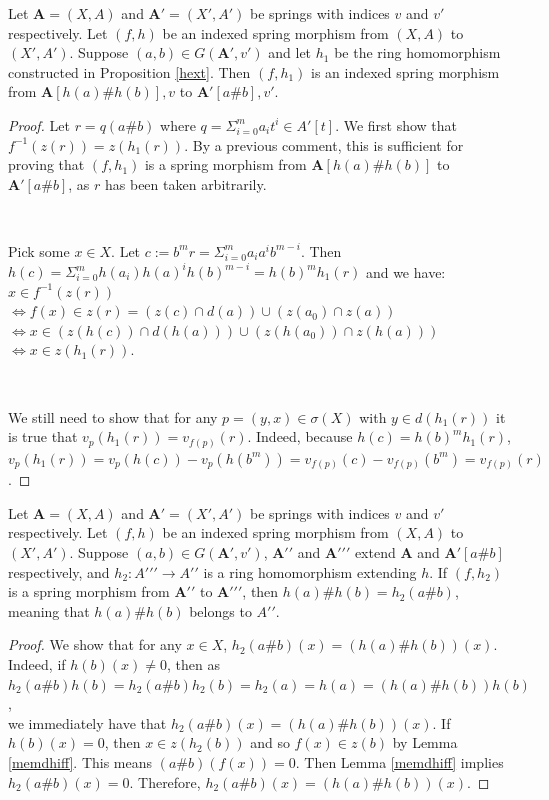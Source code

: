 \begin{proposition}
  Let $\boldsymbol{A}=(X,A)$ and $\boldsymbol{A'}=(X',A')$ be springs with indices $v$ and $v'$
  respectively. Let $(f,h)$ be an indexed spring morphism from $(X,A)$ to $(X',A')$. Suppose
  $(a,b)\in{G}(\boldsymbol{A'},v')$ and let $h_1$ be the ring homomorphism constructed in
  Proposition \ref{hext}. Then $(f,h_1)$ is an indexed spring morphism from
  $\boldsymbol{A}[h(a)\#h(b)],v$ to $\boldsymbol{A'}[a\#b],v'$.
\end{proposition}
\begin{proof}
  Let $r=q(a\#b)$ where $q=\Sigma_{i=0}^{m}{a_i}t^i\in{A'}[t]$. We first show that
  $f^{-1}(z(r))=z(h_1(r))$. By a previous comment, this is sufficient for proving that $(f,h_1)$ is
  a spring morphism from $\boldsymbol{A}[h(a)\#h(b)]$ to $\boldsymbol{A'}[a\#b]$, as $r$ has been
  taken arbitrarily.

  \

  Pick some $x\in{X}$. Let $c:=b^m{r}=\Sigma_{i=0}^m{a_i}a^i{b^{m-i}}$. Then
  $h(c)=\Sigma_{i=0}^m{h(a_i)}{h(a)^i}h(b)^{m-i}=h(b)^m{h_1(r)}$ and we have:
  \\
  $x\in{f^{-1}}(z(r))$
  \\
  $\Leftrightarrow{f(x)\in{z(r)}}=(z(c)\cap{d}(a))\cup(z(a_0)\cap{z}(a))$
  \\
  $\Leftrightarrow{x}\in(z(h(c))\cap{d}(h(a)))\cup(z(h(a_0))\cap{z}(h(a)))$
  \\
  $\Leftrightarrow{x}\in{z(h_1(r))}$.

  \

  We still need to show that for any $p=(y,x)\in\sigma(X)$ with $y\in{d}(h_1(r))$ it is true that
  $v_p(h_1(r))=v_{f(p)}(r)$. Indeed, because $h(c)=h(b)^m{h_1}(r)$,
  $v_p(h_1(r))=v_p(h(c))-v_p(h(b^m))=v_{f(p)}(c)-v_{f(p)}(b^m)=v_{f(p)}(r)$.
\end{proof}


\begin{proposition}
  Let $\boldsymbol{A}=(X,A)$ and $\boldsymbol{A'}=(X',A')$ be springs with indices $v$ and $v'$
  respectively. Let $(f,h)$ be an indexed spring morphism from $(X,A)$ to $(X',A')$. Suppose
  $(a,b)\in{G}(\boldsymbol{A'},v')$, $\boldsymbol{{A'}{'}}$ and $\boldsymbol{{A'}{'}{'}}$ extend
  $\boldsymbol{A}$ and $\boldsymbol{A'}[a\#b]$ respectively, and $h_2:{A'{'}{'}}\rightarrow{A'{'}}$
  is a ring homomorphism extending $h$. If $(f,h_2)$ is a spring morphism from $\boldsymbol{A'{'}}$
  to $\boldsymbol{A'{'}{'}}$, then $h(a)\#h(b)=h_2(a\#b)$, meaning that $h(a)\#h(b)$ belongs to
  ${A'}{'}$.
\end{proposition}
\begin{proof}
  We show that for any $x\in{X}$, $h_2(a\#b)(x)=(h(a)\#h(b))(x)$. Indeed, if $h(b)(x)\neq{0}$, then
  as
  \\
  $h_2(a\#b)h(b)=h_2(a\#b)h_2(b)=h_2(a)=h(a)=(h(a)\#h(b))h(b)$,
  \\
  we immediately have that $h_2(a\#b)(x)=(h(a)\#h(b))(x)$. If $h(b)(x)=0$, then $x\in{z}(h_2(b))$
  and so $f(x)\in{z}(b)$ by Lemma \ref{memdhiff}. This means $(a\#b)(f(x))=0$. Then Lemma
  \ref{memdhiff} implies $h_2(a\#b)(x)=0$. Therefore, $h_2(a\#b)(x)=(h(a)\#h(b))(x)$.
\end{proof}
